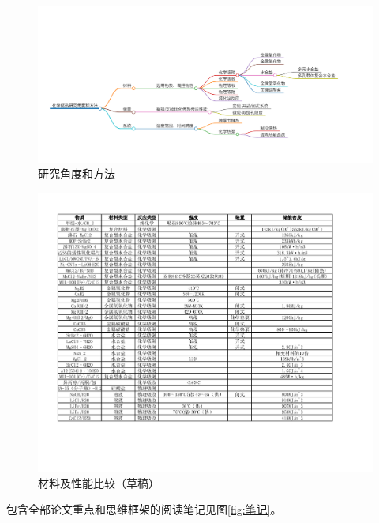\documentclass[oneside]{report}
\begin{document}
\begin{figure}[H]
    \centering
    \includegraphics[width=\textwidth]{image/CHS研究角度和方法.pdf}
    \caption{研究角度和方法}
    \label{fig:研究角度}
\end{figure}
\begin{figure}[H]
    \centering
    \includegraphics[width=\textwidth]{image/性能比较.pdf}
    \caption{材料及性能比较（草稿）}
    \label{fig:材料对比}
\end{figure}

包含全部论文重点和思维框架的阅读笔记见图\ref{fig:笔记}。
\end{document}
